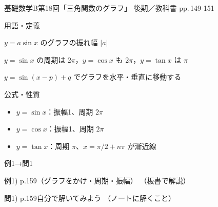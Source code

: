 \documentclass[aspectratio=43,professionalfonts,handout]{beamer}
\newcommand{\LectureNum}{18}
\newcommand{\LectureTitle}{三角関数のグラフ}
\newcommand{\TextPages}{pp.\,149-151}
\newcommand{\CourseName}{基礎数学B}
\renewcommand{\TermName}{後期}
\begin{document}
\begin{frame}{\CourseName\quad 第\LectureNum 回「\LectureTitle 」}
  {\small \TermName\quad \TeacherName\quad ／\quad 教科書 \TextPages}

  \begin{block}{用語・定義}
  \begin{description}[labelwidth=5.5em]
    \item[\kw{振幅}] $y = a\sin x$ のグラフの振れ幅 $|a|$
    \item[\kw{周期：$y = \sin x$ の周期は $2\pi$}] $y = \sin x$ の周期は $2\pi$，$y = \cos x$ も $2\pi$，$y = \tan x$ は $\pi$
    \item[\kw{平行移動：$y = \sin(x - p) + q$}] $y = \sin(x - p) + q$ でグラフを水平・垂直に移動する
  \end{description}
  \end{block}
\end{frame}

\begin{frame}{公式・性質}
  \begin{block}{}
  \begin{itemize}
    \item $y = \sin x$：振幅1、周期 $2\pi$
    \item $y = \cos x$：振幅1、周期 $2\pi$
    \item $y = \tan x$：周期 $\pi$、$x = \pi/2 + n\pi$ が漸近線
  \end{itemize}
  \end{block}
\end{frame}

\begin{frame}{例1→問1}
  \begin{exampleblock}{例1) p.159（グラフをかけ・周期・振幅）}
    （板書で解説）
  \end{exampleblock}

  \vfill

  \begin{block}{問1) p.159\quad 自分で解いてみよう}
    （ノートに解くこと）
  \end{block}
\end{frame}
\end{document}
